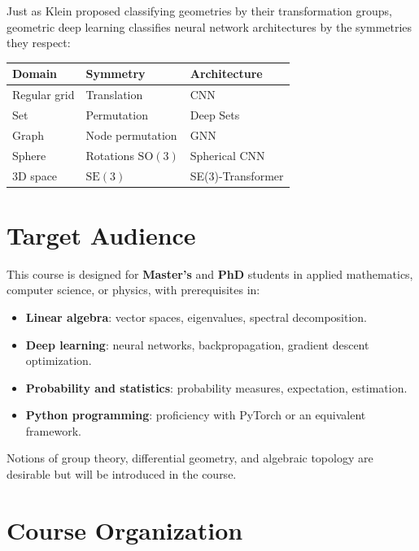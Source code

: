 \begin{intuition}[title=\textbf{The Erlangen Programme for deep learning}]
Just as Klein proposed classifying geometries by their transformation groups,
geometric deep learning classifies neural network architectures by the
symmetries they respect:
\begin{center}
\begin{tabular}{lll}
\toprule
\textbf{Domain} & \textbf{Symmetry} & \textbf{Architecture} \\
\midrule
Regular grid & Translation & CNN \\
Set & Permutation & Deep Sets \\
Graph & Node permutation & GNN \\
Sphere & Rotations $\mathrm{SO}(3)$ & Spherical CNN \\
3D space & $\mathrm{SE}(3)$ & SE(3)-Transformer \\
\bottomrule
\end{tabular}
\end{center}
\end{intuition}

\section*{Target Audience}

This course is designed for \textbf{Master's} and \textbf{PhD} students in
applied mathematics, computer science, or physics, with prerequisites in:
\begin{itemize}
    \item \textbf{Linear algebra}: vector spaces, eigenvalues, spectral decomposition.
    \item \textbf{Deep learning}: neural networks, backpropagation, gradient descent
          optimization.
    \item \textbf{Probability and statistics}: probability measures, expectation,
          estimation.
    \item \textbf{Python programming}: proficiency with PyTorch or an equivalent
          framework.
\end{itemize}

Notions of group theory, differential geometry, and algebraic topology are
desirable but will be introduced in the course.

\section*{Course Organization}

